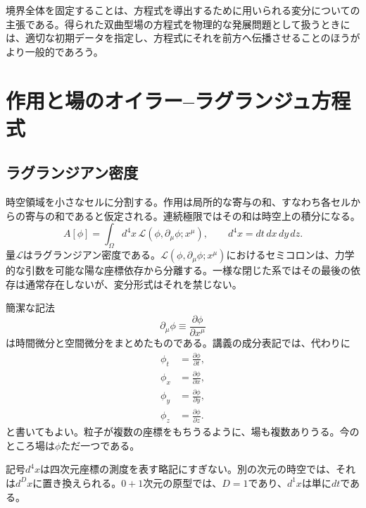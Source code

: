 境界全体を固定することは、方程式を導出するために用いられる変分についての主張である。得られた双曲型場の方程式を物理的な発展問題として扱うときには、適切な初期データを指定し、方程式にそれを前方へ伝播させることのほうがより一般的であろう。

\section{作用と場のオイラー--ラグランジュ方程式}

\subsection{ラグランジアン密度}

時空領域を小さなセルに分割する。作用は局所的な寄与の和、すなわち各セルからの寄与の和であると仮定される。連続極限ではその和は時空上の積分になる。
\begin{equation}
A[\phi]
=
\int_{\Omega} d^4x\,
\mathcal{L}\!\left(
\phi,\partial_\mu\phi;x^\mu
\right),
\qquad
d^4x=dt\,dx\,dy\,dz.
\label{eq:sr4-field-action}
\end{equation}
量\(\mathcal{L}\)はラグランジアン密度である。\(\mathcal{L}(\phi,\partial_\mu\phi;x^\mu)\)におけるセミコロンは、力学的な引数を可能な陽な座標依存から分離する。一様な閉じた系ではその最後の依存は通常存在しないが、変分形式はそれを禁じない。

簡潔な記法
\begin{equation}
\partial_\mu\phi
\equiv
\frac{\partial\phi}{\partial x^\mu}
\end{equation}
は時間微分と空間微分をまとめたものである。講義の成分表記では、代わりに
\begin{equation}
\begin{aligned}
\phi_t&=\frac{\partial\phi}{\partial t},\\
\phi_x&=\frac{\partial\phi}{\partial x},\\
\phi_y&=\frac{\partial\phi}{\partial y},\\
\phi_z&=\frac{\partial\phi}{\partial z}.
\end{aligned}
\label{eq:sr4-component-derivatives}
\end{equation}
と書いてもよい。粒子が複数の座標をもちうるように、場も複数ありうる。今のところ場は\(\phi\)ただ一つである。

記号\(d^4x\)は四次元座標の測度を表す略記にすぎない。別の次元の時空では、それは\(d^Dx\)に置き換えられる。\(0+1\)次元の原型では、\(D=1\)であり、\(d^1x\)は単に\(dt\)である。

